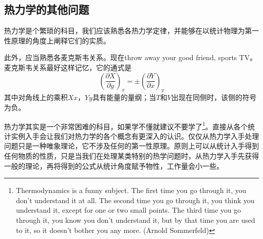\documentclass[a4paper,11pt]{ctexart}
\newcommand{\beq}{\begin{equation}}
\newcommand{\eeq}{\end{equation}}
\def\pfrac#1#2#3{\left(\frac{\partial #1}{\partial #2}\right)_{#3}}
\begin{document}
\subsection{热力学的其他问题}
热力学是个繁琐的科目，我们应该熟悉各热力学定律，并能够在以统计物理为第一性原理的角度上阐释它们的实质。
\par
此外，应当熟悉各麦克斯韦关系。现在throw away your good friend, sports TV。麦克斯韦关系最好这样记忆，它的通式是
\beq
\pfrac{X}{y}{x} = \pm \pfrac{Y}{x}{y}
\eeq
其中对角线上的乘积$Xx$，$Yy$具有能量的量纲；当$T$和$V$出现在同侧时，该侧的符号为负。
\par
热力学其实是一个非常困难的科目，如果学不懂就建议不要学了\footnote{\tiny Thermodynamics is a funny subject. The first time you go through it, you
don't understand it at all. The second time you go through it, you think
you understand it, except for one or two small points. The third time you
go through it, you know you don't understand it, but by that time you are
used to it, so it doesn't bother you any more. (Arnold Sommerfeld)}。直接从各个统计实例入手会让我们对热力学的各个概念有更深入的认识。仅仅从热力学入手处理问题只是一种唯象理论，它不涉及任何的第一性原理。原则上可以从统计入手得到任何物质的性质，只是当我们在处理某类特别的热学问题时，从热力学入手先获得一般的理论，再将得到的公式从统计角度赋予物性，工作量会小一些。
\end{document}
